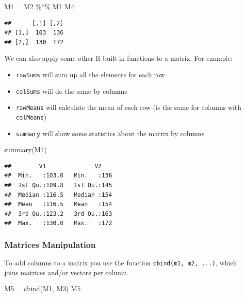 \documentclass[
]{book}
\newenvironment{Shaded}{\begin{snugshade}}{\end{snugshade}}
\newcommand{\FunctionTok}[1]{\textcolor[rgb]{0.00,0.00,0.00}{#1}}
\newcommand{\NormalTok}[1]{#1}
\newcommand{\OtherTok}[1]{\textcolor[rgb]{0.56,0.35,0.01}{#1}}
\newcommand{\SpecialCharTok}[1]{\textcolor[rgb]{0.00,0.00,0.00}{#1}}
\providecommand{\tightlist}{%
  \setlength{\itemsep}{0pt}\setlength{\parskip}{0pt}}
\theoremstyle{definition}
\theoremstyle{definition}
\theoremstyle{definition}
\theoremstyle{definition}
\theoremstyle{remark}
\begin{document}
\begin{Shaded}
\begin{Highlighting}[]
\NormalTok{M4 }\OtherTok{=}\NormalTok{ M2 }\SpecialCharTok{\%*\%}\NormalTok{ M1}
\NormalTok{M4}
\end{Highlighting}
\end{Shaded}

\begin{verbatim}
##      [,1] [,2]
## [1,]  103  136
## [2,]  130  172
\end{verbatim}

We can also apply some other R built-in functions to a matrix. For example:

\begin{itemize}
\tightlist
\item
  \texttt{rowSums} will sum up all the elements for each row
\item
  \texttt{colSums} will do the same by columns
\item
  \texttt{rowMeans} will calculate the mean of each row (is the same for columns with \texttt{colMeans})
\item
  \texttt{summary} will show some statistics about the matrix by columns
\end{itemize}

\begin{Shaded}
\begin{Highlighting}[]
\FunctionTok{summary}\NormalTok{(M4)}
\end{Highlighting}
\end{Shaded}

\begin{verbatim}
##        V1              V2     
##  Min.   :103.0   Min.   :136  
##  1st Qu.:109.8   1st Qu.:145  
##  Median :116.5   Median :154  
##  Mean   :116.5   Mean   :154  
##  3rd Qu.:123.2   3rd Qu.:163  
##  Max.   :130.0   Max.   :172
\end{verbatim}

\hypertarget{matrices-manipulation}{%
\subsubsection{Matrices Manipulation}\label{matrices-manipulation}}

To add columns to a matrix you use the function \texttt{cbind(m1,\ m2,\ ...)}, which joins matrices and/or vectors per column.

\begin{Shaded}
\begin{Highlighting}[]
\NormalTok{M5 }\OtherTok{=} \FunctionTok{cbind}\NormalTok{(M1, M3)}
\NormalTok{M5}
\end{Highlighting}
\end{Shaded}
\end{document}
